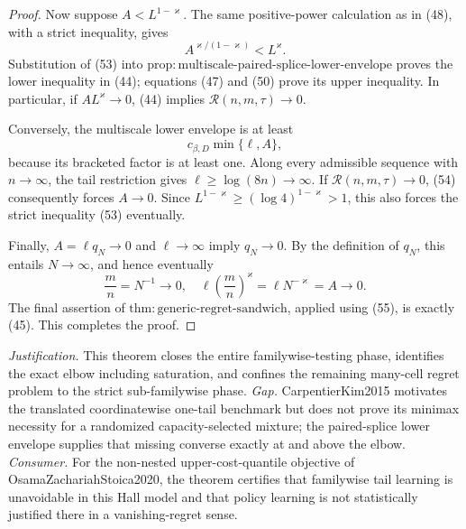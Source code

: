 \documentclass{article}
\begin{document}
\begin{proof}
Now suppose \(A<L^{1-\varkappa}\). The same positive-power calculation as in (48), with a strict inequality, gives
\[
A^{\varkappa/(1-\varkappa)}<L^{\varkappa}.                              \tag{53}
\]
Substitution of (53) into \(\mathrm{prop{:}multiscale\text{-}paired\text{-}splice\text{-}lower\text{-}envelope}\) proves the lower inequality in (44); equations (47) and (50) prove its upper inequality. In particular, if \(AL^{\varkappa}\to0\), (44) implies \(\mathcal R(n,m,\tau)\to0\).

Conversely, the multiscale lower envelope is at least
\[
c_{\beta,D}\min\{\ell,A\},                                            \tag{54}
\]
because its bracketed factor is at least one. Along every admissible sequence with \(n\to\infty\), the tail restriction gives \(\ell\geq\log(8n)\to\infty\). If \(\mathcal R(n,m,\tau)\to0\), (54) consequently forces \(A\to0\). Since \(L^{1-\varkappa}\geq(\log4)^{1-\varkappa}>1\), this also forces the strict inequality (53) eventually.

Finally, \(A=\ell q_N\to0\) and \(\ell\to\infty\) imply \(q_N\to0\). By the definition of \(q_N\), this entails \(N\to\infty\), and hence eventually
\[
\frac mn=N^{-1}\longrightarrow0,\quad
\ell\left(\frac mn\right)^{\varkappa}=\ell N^{-\varkappa}=A\longrightarrow0. \tag{55}
\]
The final assertion of \(\mathrm{thm{:}generic\text{-}regret\text{-}sandwich}\), applied using (55), is exactly (45). This completes the proof.
\end{proof}
\par\smallskip\noindent \textit{Justification.} This theorem closes the entire familywise-testing phase, identifies the exact elbow including saturation, and confines the remaining many-cell regret problem to the strict sub-familywise phase. \textit{Gap.} CarpentierKim2015 motivates the translated coordinatewise one-tail benchmark but does not prove its minimax necessity for a randomized capacity-selected mixture; the paired-splice lower envelope supplies that missing converse exactly at and above the elbow. \textit{Consumer.} For the non-nested upper-cost-quantile objective of OsamaZachariahStoica2020, the theorem certifies that familywise tail learning is unavoidable in this Hall model and that policy learning is not statistically justified there in a vanishing-regret sense.
\end{document}
